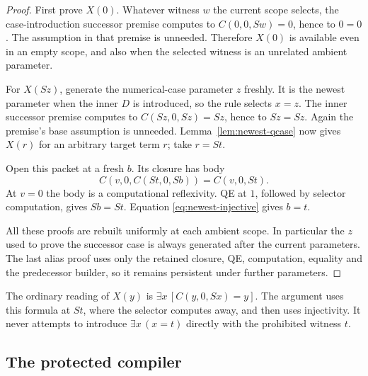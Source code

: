 \begin{proof}
First prove $X(0)$. Whatever witness $w$ the current scope selects,
the case-introduction successor premise computes to
$C(0,0,Sw)=0$, hence to $0=0$. The assumption in that premise is
unneeded. Therefore $X(0)$ is available even in an empty scope, and
also when the selected witness is an unrelated ambient parameter.

For $X(Sz)$, generate the numerical-case parameter $z$ freshly.
It is the newest parameter when the inner $D$ is introduced, so the
rule selects $x=z$. The inner successor premise computes to
$C(Sz,0,Sz)=Sz$, hence to $Sz=Sz$. Again the premise's base assumption
is unneeded. Lemma~\ref{lem:newest-qcase} now gives $X(r)$ for an
arbitrary target term $r$; take $r=St$.

Open this packet at a fresh $b$. Its closure has body
\[
 C(v,0,C(St,0,Sb))=C(v,0,St).
\]
At $v=0$ the body is a computational reflexivity. QE at $1$, followed
by selector computation, gives $Sb=St$. Equation
\eqref{eq:newest-injective} gives $b=t$.

All these proofs are rebuilt uniformly at each ambient scope. In
particular the $z$ used to prove the successor case is always generated
after the current parameters. The last alias proof uses only the retained
closure, QE, computation, equality and the predecessor builder, so it
remains persistent under further parameters.
\end{proof}

The ordinary reading of $X(y)$ is
$\exists x\,[C(y,0,Sx)=y]$. The argument uses this formula at $St$,
where the selector computes away, and then uses injectivity. It never
attempts to introduce $\exists x\,(x=t)$ directly with the prohibited
witness $t$.

\subsection{The protected compiler}

